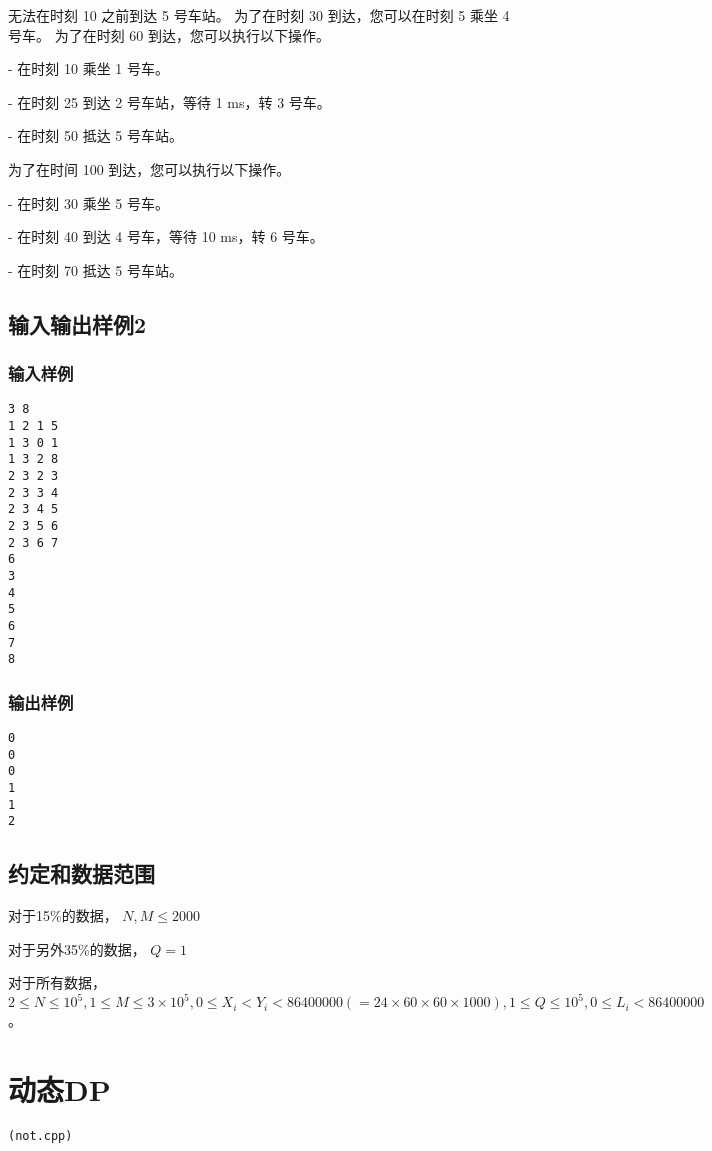 \documentclass[UTF8]{ctexart}
\begin{document}
无法在时刻 10 之前到达 5 号车站。 为了在时刻 30 到达，您可以在时刻 5 乘坐 4 号车。 为了在时刻 60 到达，您可以执行以下操作。

- 在时刻 10 乘坐 1 号车。

- 在时刻 25 到达 2 号车站，等待 1 ms，转 3 号车。

- 在时刻 50 抵达 5 号车站。

为了在时间 100 到达，您可以执行以下操作。

- 在时刻 30 乘坐 5 号车。

- 在时刻 40 到达 4 号车，等待 10 ms，转 6 号车。

- 在时刻 70 抵达 5 号车站。

\subsection{输入输出样例2}
\subsubsection{输入样例}

\begin{lstlisting}
3 8
1 2 1 5
1 3 0 1
1 3 2 8
2 3 2 3
2 3 3 4
2 3 4 5
2 3 5 6
2 3 6 7
6
3
4
5
6
7
8
\end{lstlisting}


\subsubsection{输出样例}

\begin{lstlisting}
0
0
0
1
1
2
\end{lstlisting}

\subsection{约定和数据范围}

对于15\%的数据， $N,M\le 2000$

对于另外35\%的数据， $Q=1$

对于所有数据， $2\le N\le 10^5,1\le M\le 3\times 10^5,0\le X_i<Y_i<86400000(=24\times 60\times 60\times 1000),1\le Q\le 10^5,0\le L_i<86400000$。



\newpage
\section{动态DP}
\begin{center}
\tt\large{(not.cpp)}
\end{center}
\end{document}
